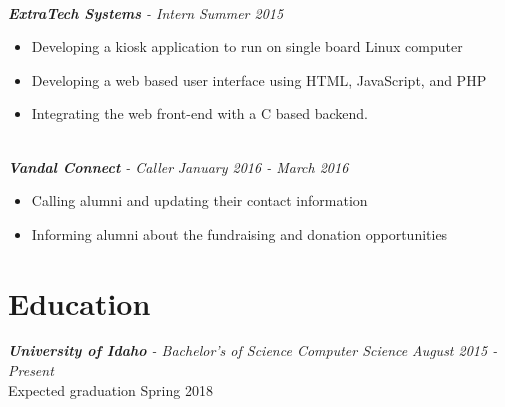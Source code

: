 \documentclass[10pt]{article}
\begin{document}
  \vspace{2mm}
  \noindent
  \\ \textit{\textbf{ExtraTech Systems} - Intern} \hfill \textit{Summer 2015}
    \begin{adjustwidth}{5mm}{}
      \begin{itemize}[noitemsep,nolistsep]
        \item Developing a kiosk application to run on single board Linux computer
        \item Developing a web based user interface using HTML, JavaScript, and PHP
        \item Integrating the web front-end with a C based backend.
  	  \end{itemize}
    \end{adjustwidth}
  \vspace{2mm}
  \noindent
  \\ \textit{\textbf{Vandal Connect} - Caller} \hfill \textit{January 2016 - March 2016}
    \begin{adjustwidth}{5mm}{}
      \begin{itemize}[noitemsep,nolistsep]
        \item Calling alumni and updating their contact information
        \item Informing alumni about the fundraising and donation opportunities
  	  \end{itemize}
    \end{adjustwidth}
\vspace{4mm}
\section*{Education}
  \vspace{2mm}
  \textit{\textbf{University of Idaho} - Bachelor's of Science Computer Science} \hfill \textit{August 2015 - Present}
  \\ Expected graduation Spring 2018
\end{document}
